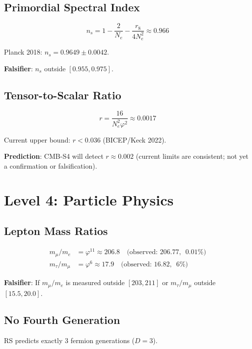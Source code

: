 \documentclass[12pt,a4paper]{article}
\theoremstyle{definition}
\theoremstyle{remark}
\begin{document}
\subsection{Primordial Spectral Index}

\begin{equation}
n_s = 1 - \frac{2}{N_e} - \frac{r_8}{4N_e^2} \approx 0.966
\end{equation}

Planck 2018: $n_s = 0.9649 \pm 0.0042$.

\textbf{Falsifier}: $n_s$ outside $[0.955, 0.975]$.

\subsection{Tensor-to-Scalar Ratio}

\begin{equation}
r = \frac{16}{N_e^2 \varphi^2} \approx 0.0017
\end{equation}

Current upper bound: $r < 0.036$ (BICEP/Keck 2022).

\textbf{Prediction}: CMB-S4 will detect $r \approx 0.002$ (current limits are consistent; 
not yet a confirmation or falsification).

\section{Level 4: Particle Physics}

\subsection{Lepton Mass Ratios}

\begin{align}
m_\mu/m_e &= \varphi^{11} \approx 206.8 \quad \text{(observed: 206.77, ~0.01\%)}\\
m_\tau/m_\mu &= \varphi^6 \approx 17.9 \quad \text{(observed: 16.82, ~6\%)}
\end{align}

\textbf{Falsifier}: If $m_\mu/m_e$ is measured outside $[203, 211]$ or 
$m_\tau/m_\mu$ outside $[15.5, 20.0]$.

\subsection{No Fourth Generation}

RS predicts exactly 3 fermion generations ($D = 3$). 
\end{document}
